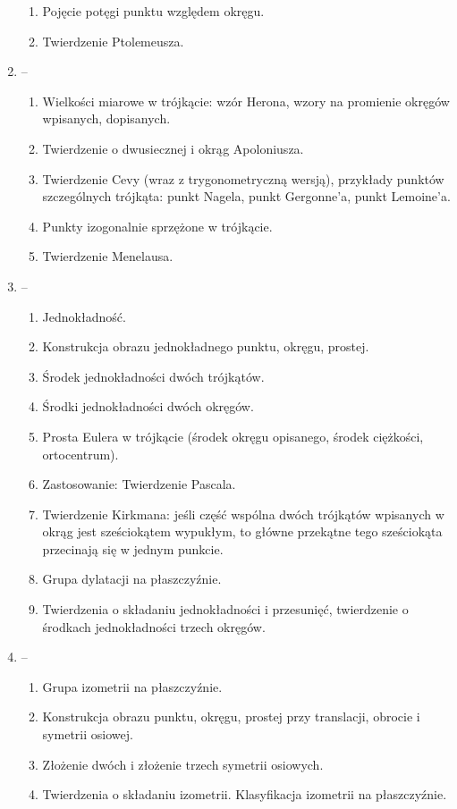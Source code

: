 \documentclass{parchment}
\begin{document}
\begin{enumerate}
\begin{enumerate}
		\item Pojęcie potęgi punktu względem okręgu.
		\item Twierdzenie Ptolemeusza.
	\end{enumerate}
	\item -- \begin{enumerate}
		\item Wielkości miarowe w trójkącie: wzór Herona, wzory na promienie okręgów wpisanych, dopisanych.
		\item Twierdzenie o dwusiecznej i okrąg Apoloniusza.
		\item Twierdzenie Cevy (wraz z trygonometryczną wersją), przykłady punktów szczególnych trójkąta: punkt Nagela, punkt Gergonne'a, punkt Lemoine'a.
		\item Punkty izogonalnie sprzężone w trójkącie.
		\item Twierdzenie Menelausa.
	\end{enumerate}
	\item -- \begin{enumerate}
		\item Jednokładność.
		\item Konstrukcja obrazu jednokładnego punktu, okręgu, prostej.
		\item Środek jednokładności dwóch trójkątów.
		\item Środki jednokładności dwóch okręgów.
		\item Prosta Eulera w trójkącie (środek okręgu opisanego, środek ciężkości, ortocentrum).
		\item Zastosowanie: Twierdzenie Pascala.
		\item Twierdzenie Kirkmana: jeśli część wspólna dwóch trójkątów wpisanych w okrąg jest sześciokątem wypukłym, to główne przekątne tego sześciokąta przecinają się w jednym punkcie.
		\item Grupa dylatacji na płaszczyźnie.
		\item Twierdzenia o składaniu jednokładności i przesunięć, twierdzenie o środkach jednokładności trzech okręgów.
	\end{enumerate}
	\item -- \begin{enumerate}
		\item Grupa izometrii na płaszczyźnie.
		\item Konstrukcja obrazu punktu, okręgu, prostej przy translacji, obrocie i symetrii osiowej.
		\item Złożenie dwóch i złożenie trzech symetrii osiowych. 
		\item Twierdzenia o składaniu izometrii. Klasyfikacja izometrii na płaszczyźnie. 

\end{enumerate}
\end{enumerate}
\end{document}
